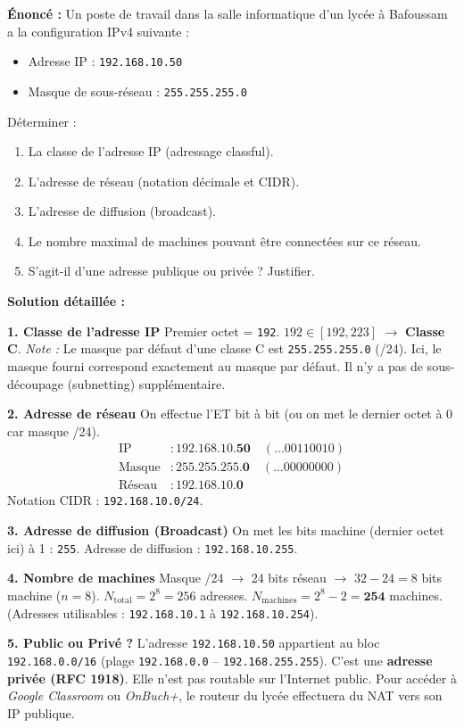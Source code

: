 \documentclass[11pt]{article}
\begin{document}
\begin{exoresolu}
\textbf{Énoncé :} Un poste de travail dans la salle informatique d'un lycée à Bafoussam a la configuration IPv4 suivante :
\begin{itemize}
    \item Adresse IP : \texttt{192.168.10.50}
    \item Masque de sous-réseau : \texttt{255.255.255.0}
\end{itemize}
Déterminer :
\begin{enumerate}
    \item La classe de l'adresse IP (adressage classful).
    \item L'adresse de réseau (notation décimale et CIDR).
    \item L'adresse de diffusion (broadcast).
    \item Le nombre maximal de machines pouvant être connectées sur ce réseau.
    \item S'agit-il d'une adresse publique ou privée ? Justifier.
\end{enumerate}

\tcblower
\textbf{Solution détaillée :}

\textbf{1. Classe de l'adresse IP}
Premier octet = \texttt{192}.
$192 \in [192, 223]$ $\rightarrow$ \textbf{Classe C}.
\emph{Note :} Le masque par défaut d'une classe C est \texttt{255.255.255.0} (/24). Ici, le masque fourni correspond exactement au masque par défaut. Il n'y a pas de sous-découpage (subnetting) supplémentaire.

\textbf{2. Adresse de réseau}
On effectue l'ET bit à bit (ou on met le dernier octet à 0 car masque /24).
\begin{align*}
\text{IP}    &: 192.168.10.\mathbf{50} \quad (\dots 00110010) \\
\text{Masque} &: 255.255.255.\mathbf{0} \quad (\dots 00000000) \\
\text{Réseau} &: 192.168.10.\mathbf{0}
\end{align*}
Notation CIDR : \texttt{192.168.10.0/24}.

\textbf{3. Adresse de diffusion (Broadcast)}
On met les bits machine (dernier octet ici) à 1 : \texttt{255}.
Adresse de diffusion : \texttt{192.168.10.255}.

\textbf{4. Nombre de machines}
Masque /24 $\rightarrow$ 24 bits réseau $\rightarrow$ $32 - 24 = 8$ bits machine ($n=8$).
$N_{\text{total}} = 2^8 = 256$ adresses.
$N_{\text{machines}} = 2^8 - 2 = \mathbf{254}$ machines.
(Adresses utilisables : \texttt{192.168.10.1} à \texttt{192.168.10.254}).

\textbf{5. Public ou Privé ?}
L'adresse \texttt{192.168.10.50} appartient au bloc \texttt{192.168.0.0/16} (plage \texttt{192.168.0.0} -- \texttt{192.168.255.255}).
C'est une \textbf{adresse privée (RFC 1918)}. Elle n'est pas routable sur l'Internet public. Pour accéder à \emph{Google Classroom} ou \emph{OnBuch+}, le routeur du lycée effectuera du NAT vers son IP publique.
\end{exoresolu}
\end{document}
